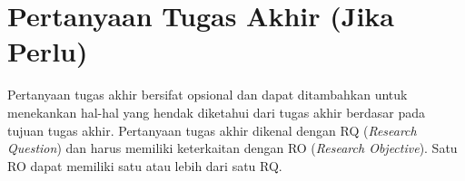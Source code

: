\section{Pertanyaan Tugas Akhir (Jika Perlu)}

Pertanyaan tugas akhir bersifat opsional dan dapat ditambahkan untuk menekankan hal-hal yang hendak diketahui dari tugas akhir berdasar pada tujuan tugas akhir. Pertanyaan tugas akhir dikenal dengan RQ (\textit{Research Question}) dan harus memiliki keterkaitan dengan RO (\textit{Research Objective}). Satu RO dapat memiliki satu atau lebih dari satu RQ. 

